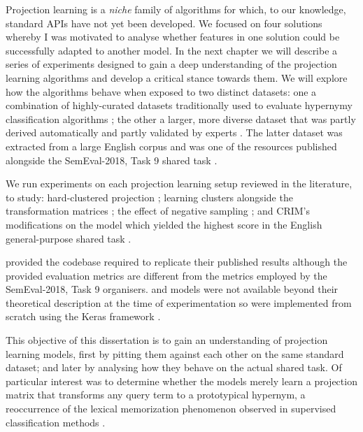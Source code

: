 Projection learning is a \textit{niche} family of algorithms for which, to our knowledge, standard APIs have not yet been developed.  We focused on four solutions whereby I was motivated to analyse whether features in one solution could be successfully adapted to another model. In the next chapter we will describe a series of experiments designed to gain a deep understanding of the projection learning algorithms and develop a critical stance towards them.  We will explore how the algorithms behave when exposed to two distinct datasets: one a combination of highly-curated datasets traditionally used to evaluate hypernymy classification algorithms \citep{Baroni2011, santus2015evalution, santus2016nine, necsulescu2015reading}; the other a larger, more diverse dataset that was partly derived automatically and partly validated by experts \citep{camacho2018semeval}.  The latter dataset was extracted from a large English corpus and was one of the resources published alongside the SemEval-2018, Task 9 shared task \citep{camacho2018semeval}.

We run experiments on each projection learning setup reviewed in the literature, to study: hard-clustered projection \citep{Fu2014}; learning clusters alongside the transformation matrices \citep{yamane2016distributional}; the effect of negative sampling \citep{ustalov2017negative}; and \ac{CRIM}’s modifications on the \citep{yamane2016distributional} model which yielded the highest score in the English general-purpose shared task \citep{bernier2018crim}.  

\citeauthor{ustalov2017negative} provided the codebase required to replicate their published results although the provided evaluation metrics are different from the metrics employed by the SemEval-2018, Task 9 organisers.  \citep{yamane2016distributional} and \citep{bernier2018crim} models were not available beyond their theoretical description at the time of experimentation so were implemented from scratch using the Keras framework \citep{chollet2015keras}.

This objective of this dissertation is to gain an understanding of projection learning models, first by pitting them against each other on the same standard dataset; and later by analysing how they behave on the actual shared task.  Of particular interest was to determine whether the models merely learn a projection matrix that transforms any query term to a prototypical hypernym, a reoccurrence of the lexical memorization phenomenon observed in supervised classification methods \citep{levy2015supervised}.
